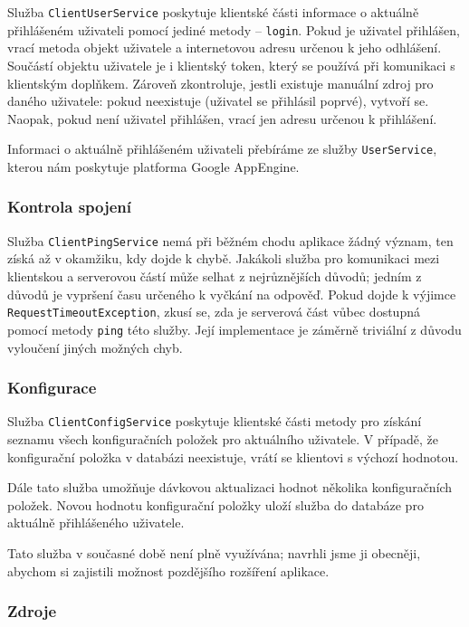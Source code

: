 Služba \verb|ClientUserService| poskytuje klientské části informace o aktuálně přihlášeném uživateli pomocí jediné metody -- \verb|login|.
Pokud je uživatel přihlášen, vrací metoda objekt uživatele a internetovou adresu určenou k jeho odhlášení.
Součástí objektu uživatele je i klientský token, který se používá při komunikaci s klientským doplňkem.
Zároveň zkontroluje, jestli existuje manuální zdroj pro daného uživatele: pokud neexistuje (uživatel se přihlásil poprvé), vytvoří se.
Naopak, pokud není uživatel přihlášen, vrací jen adresu určenou k přihlášení.

Informaci o aktuálně přihlášeném uživateli přebíráme ze služby \verb|UserService|, kterou nám poskytuje platforma Google AppEngine.

\subsubsection{Kontrola spojení}

Služba \verb|ClientPingService| nemá při běžném chodu aplikace žádný význam, ten získá až v okamžiku, kdy dojde k chybě.
Jakákoli služba pro komunikaci mezi klientskou a serverovou částí může selhat z nejrůznějších důvodů; jedním z důvodů je vypršení času určeného k vyčkání na odpověď.
Pokud dojde k výjimce \verb|RequestTimeoutException|, zkusí se, zda je serverová část vůbec dostupná pomocí metody \verb|ping| této služby.
Její implementace je záměrně triviální z důvodu vyloučení jiných možných chyb.

\subsubsection{Konfigurace}

Služba \verb|ClientConfigService| poskytuje klientské části metody pro získání seznamu všech konfiguračních položek pro aktuálního uživatele.
V případě, že konfigurační položka v databázi neexistuje, vrátí se klientovi s výchozí hodnotou.

Dále tato služba umožňuje dávkovou aktualizaci hodnot několika konfiguračních položek.
Novou hodnotu konfigurační položky uloží služba do databáze pro aktuálně přihlášeného uživatele.

Tato služba v současné době není plně využívána; navrhli jsme ji obecněji, abychom si zajistili možnost pozdějšího rozšíření aplikace.

\subsubsection{Zdroje}

